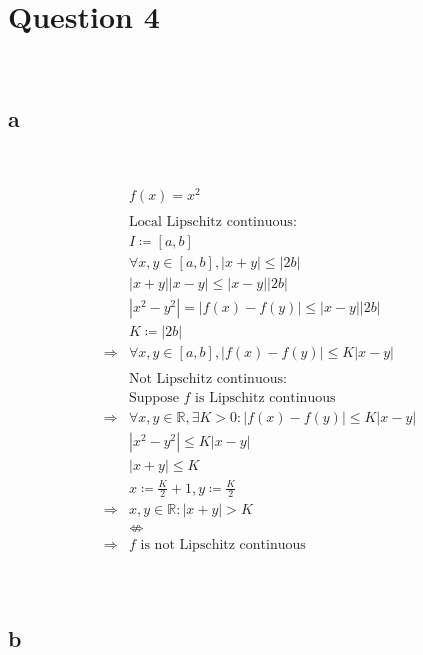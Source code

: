 \documentclass{article}
\begin{document}
\newpage

\section*{Question 4}

~

\subsection*{a}

~

\begin{align*}
    &f(x)=x^2\\
    &\\
    &\text{Local Lipschitz continuous}:\\
    &I\coloneqq [a,b]\\
    &\forall x,y\in [a,b],|x+y|\leqslant |2b|\\
    &|x+y||x-y|\leqslant |x-y||2b|\\
    &|x^2-y^2|=|f(x)-f(y)|\leqslant |x-y||2b|\\
    &K\coloneqq |2b|\\
    \Rightarrow&\forall x,y\in[a,b],|f(x)-f(y)|\leqslant K|x-y|\\
    &\\
    &\text{Not Lipschitz continuous}:\\
    &\text{Suppose }f\text{ is Lipschitz continuous}\\
    \Rightarrow&\forall x,y\in \mathbb{R},\exists K>0: |f(x)-f(y)|\leqslant K|x-y|\\
    &|x^2-y^2|\leqslant K|x-y|\\
    &|x+y|\leqslant K\\
    &x\coloneqq \frac{K}{2}+1,y\coloneqq \frac{K}{2}\\
    \Rightarrow&x,y\in\mathbb{R}:|x+y|>K\\
    &\nLeftrightarrow\\
    \Rightarrow&f\text{ is not Lipschitz continuous}\\
\end{align*}

~

\subsection*{b}

~
\end{document}
